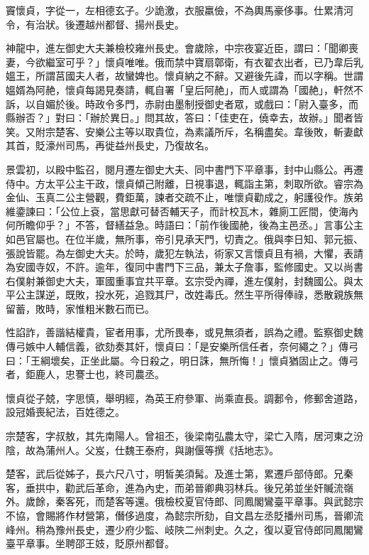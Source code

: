 \begin{pinyinscope}
 竇懷貞，字從一，左相德玄子。少詭激，衣服羸儉，不為輿馬豪侈事。仕累清河令，有治狀。後遷越州都督、揚州長史。



 神龍中，進左御史大夫兼檢校雍州長史。會歲除，中宗夜宴近臣，謂曰：「聞卿喪妻，今欲繼室可乎？」懷貞唯唯。俄而禁中寶扇鄣衛，有衣翟衣出者，已乃韋后乳媼王，所謂莒國夫人者，故蠻婢也。懷貞納之不辭。又避後先諱，而以字稱。世謂媼婿為阿赩，懷貞每謁見奏請，輒自署「皇后阿赩」，而人或謂為「國赩」，軒然不訴，以自媚於後。時政令多門，赤尉由墨制授御史者眾，或戲曰：「尉入臺多，而縣辦否？」對曰：「辦於異日。」問其故，答曰：「佳吏在，僥幸去，故辦。」聞者皆笑。又附宗楚客、安樂公主等以取貴位，為素議所斥，名稱盡矣。韋後敗，斬妻獻其首，貶濠州司馬，再徙益州長史，乃復故名。



 景雲初，以殿中監召，閱月遷左御史大夫、同中書門下平章事，封中山縣公。再遷侍中。方太平公主干政，懷貞傾己附離，日視事退，輒詣主第，刺取所欲。睿宗為金仙、玉真二公主營觀，費鉅萬，諫者交疏不止，唯懷貞勸成之，躬護役作。族弟維鍌諫曰：「公位上袞，當思獻可替否輔天子，而計校瓦木，雜廁工匠間，使海內何所瞻仰乎？」不答，督繕益急。時語曰：「前作後國赩，後為主邑丞。」言事公主如邑官屬也。在位半歲，無所事，帝引見承天門，切責之。俄與李日知、郭元振、張說皆罷。為左御史大夫。於時，歲犯左執法，術家又言懷貞且有禍，大懼，表請為安國寺奴，不許。逾年，復同中書門下三品，兼太子詹事，監修國史。又以尚書右僕射兼御史大夫，軍國重事宜共平章。玄宗受內禪，進左僕射，封魏國公。與太平公主謀逆，既敗，投水死，追戮其尸，改姓毒氏。然生平所得俸祿，悉散親族無留蓄，敗時，家惟粗米數石而已。



 性諂詐，善諧結權貴，宦者用事，尤所畏奉，或見無須者，誤為之禮。監察御史魏傳弓嫉中人輔信義，欲劾奏其奸，懷貞曰：「是安樂所信任者，奈何繩之？」傳弓曰：「王綱壞矣，正坐此屬。今日殺之，明日誅，無所悔！」懷貞猶固止之。傳弓者，鉅鹿人，忠謇士也，終司農丞。



 懷貞從子兢，字思慎，舉明經，為英王府參軍、尚乘直長。調郪令，修郵舍道路，設冠婚喪紀法，百姓德之。



 宗楚客，字叔敖，其先南陽人。曾祖丕，後梁南弘農太守，梁亡入隋，居河東之汾陰，故為蒲州人。父岌，仕魏王泰府，與謝偃等撰《括地志》。



 楚客，武后從姊子，長六尺八寸，明皙美須髯。及進士第，累遷戶部侍郎。兄秦客，垂拱中，勸武后革命，進為內史，而弟晉卿典羽林兵。後兄弟並坐奸贓流嶺外。歲餘，秦客死，而楚客等還。俄檢校夏官侍郎、同鳳閣鸞臺平章事。與武懿宗不協，會賜將作材營第，僭侈過度，為懿宗所劾，自文昌左丞貶播州司馬，晉卿流峰州。稍為豫州長史，遷少府少監、岐陜二州刺史。久之，復以夏官侍郎同鳳閣鸞臺平章事。坐聘邵王妓，貶原州都督。




\end{pinyinscope}
